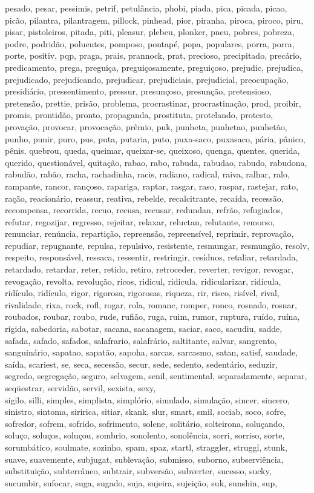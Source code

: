 pesado, pesar, pessimis, petrif, petulância, phobi, piada, pica, picada, picao, picão, pilantra, pilantragem, pillock, pinhead, pior, piranha, piroca, piroco, piru, pisar, pistoleiros, pitada, piti, pleasur, plebeu, plonker, pneu, pobres, pobreza, podre, podridão, poluentes, pomposo, pontapé, popa, populares, porra, porra, porte, positiv, pqp, praga, prais, prannock, prat, precioso, precipitado, precário, predicamento, prega, preguiça, preguiçosamente, preguiçoso, prejudic, prejudica, prejudicado, prejudicando, prejudicar, prejudiciais, prejudicial, preocupação, presidiário, pressentimento, pressur, presunçoso, presunção, pretensioso, pretensão, prettie, prisão, problema, procrastinar, procrastinação, prod, proibir, promis, prontidão, pronto, propaganda, prostituta, protelando, protesto, provação, provocar, provocação, prêmio, puk, punheta, punhetao, punhetão, punho, punir, puro, pus, puta, putaria, puto, puxa-saco, puxasaco, pária, pânico, pênis, quebrou, queda, queimar, queixar-se, queixoso, quenga, quentes, querida, querido, questionável, quitação, rabao, rabo, rabuda, rabudao, rabudo, rabudona, rabudão, rabão, racha, rachadinha, racis, radiano, radical, raiva, ralhar, ralo, rampante, rancor, rançoso, rapariga, raptar, rasgar, raso, raspar, rastejar, rato, ração, reacionário, reassur, reativa, rebelde, recalcitrante, recaída, recessão, recompensa, recorrida, recuo, recusa, recusar, redundan, refrão, refugiados, refutar, regozijar, regresso, rejeitar, relaxar, reluctan, relutante, remorso, renunciar, renúncia, repartição, repreensão, repreensível, reprimir, reprovação, repudiar, repugnante, repulsa, repulsivo, resistente, resmungar, resmungão, resolv, respeito, responsável, ressaca, ressentir, restringir, resíduos, retaliar, retardada, retardado, retardar, reter, retido, retiro, retroceder, reverter, revigor, revogar, revogação, revolta, revolução, ricos, ridicul, ridicula, ridicularizar, ridícula, ridículo, ridículo, rigor, rigorosa, rigorosas, riqueza, rir, risco, risível, rival, rivalidade, rixa, rock, rofl, rogar, rola, romanc, romper, ronco, rosnado, rosnar, roubados, roubar, roubo, rude, rufião, ruga, ruim, rumor, ruptura, ruído, ruína, rígida, sabedoria, sabotar, sacana, sacanagem, saciar, saco, sacudiu, sadde, safada, safado, safados, salafrario, salafrário, saltitante, salvar, sangrento, sanguinário, sapatao, sapatão, sapoha, sarcas, sarcasmo, satan, satisf, saudade, saída, scariest, se, seca, secessão, secur, sede, sedento, sedentário, seduzir, segredo, segregação, seguro, selvagem, senil, sentimental, separadamente, separar, seqüestrar, servidão, servil, sexista, sexy, \\ sigilo, silli, simples, simplista, simplório, simulado, simulação, sincer, sincero, sinistro, sintoma, siririca, sitiar, skank, slur, smart, smil, sociab, soco, sofre, sofredor, sofrem, sofrido, sofrimento, solene, solitário, solteirona, soluçando, soluço, soluços, soluçou, sombrio, sonolento, sonolência, sorri, sorriso, sorte, sorumbático, soulmate, sozinho, spam, spaz, startl, straggler, struggl, stunk, suave, suavemente, subjugat, sublevação, submisso, suborno, subserviência, substituição, subterrâneo, subtrair, subversão, subverter, sucesso, sucky, sucumbir, sufocar, suga, sugado, suja, sujeira, sujeição, suk, sunshin, sup, 